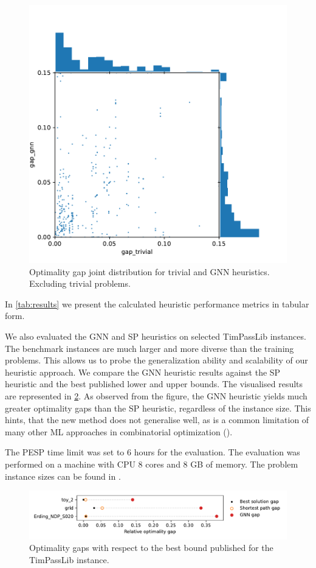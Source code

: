\documentclass[english, 12pt, a4paper, sci, utf8, a-2b, online]{aaltothesis}
\begin{document}
\begin{figure}
    \centering
    \includegraphics[width=0.75\linewidth]{figures/gap-gap-excl-trivials.pdf}
    \caption{Optimality gap joint distribution for trivial and GNN heuristics. Excluding trivial problems.}
    \label{fig:results-gg-excl-trivial}
\end{figure}

In \cref{tab:results} we present the calculated heuristic performance metrics in tabular form. 

We also evaluated the GNN and SP heuristics on selected TimPassLib instances. The benchmark instances are much larger and more diverse than the training problems. This allows us to probe the generalization ability and scalability of our heuristic approach. We compare the GNN heuristic results against the SP heuristic and the best published lower and upper bounds. The visualised results are represented in \cref{fig:eval-timpasslib}. As observed from the figure, the GNN heuristic yields much greater optimality gaps than the SP heuristic, regardless of the instance size. This hints, that the new method does not generalise well, as is a common limitation of many other ML approaches in combinatorial optimization (\cite{cappart2023combinatorial}).


The PESP time limit was set to 6 hours for the evaluation. The evaluation was performed on a machine with CPU 8 cores and 8 GB of memory. The problem instance sizes can be found in \cite{schiewe2023introducing}.
\begin{figure}
    \centering
    \includegraphics[width=\linewidth]{figures/eval-timpasslib.pdf}
    \caption{Optimality gaps with respect to the best bound published for the TimPassLib instance.} 
    \label{fig:eval-timpasslib}
\end{figure}
\end{document}
